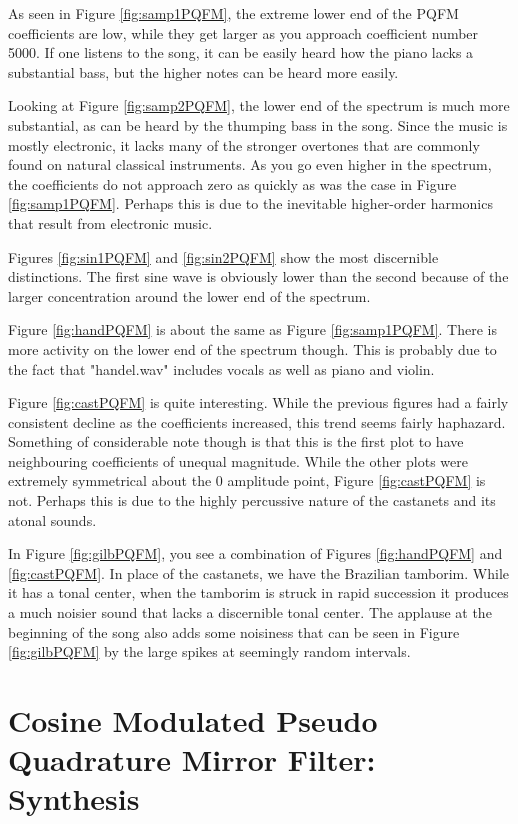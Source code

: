 \documentclass{article} %
\begin{document}
As seen in Figure \ref{fig:samp1PQFM}, the extreme lower end of the PQFM
coefficients are low, while they get larger as you approach coefficient
number 5000. If one listens to the song, it can be easily heard how the
piano lacks a substantial bass, but the higher notes can be heard more
easily. 

Looking at Figure \ref{fig:samp2PQFM}, the lower end of the spectrum is
much more substantial, as can be heard by the thumping bass in the song.
Since the music is mostly electronic, it lacks many of the stronger
overtones that are commonly found on natural classical instruments. As you
go even higher in the spectrum, the coefficients do not approach zero as
quickly as was the case in Figure \ref{fig:samp1PQFM}. Perhaps this is due
to the inevitable higher-order harmonics that result from electronic
music. 

Figures \ref{fig:sin1PQFM} and \ref{fig:sin2PQFM} show the most
discernible distinctions. The first sine wave is obviously lower than the
second because of the larger concentration around the lower end of the
spectrum. 

Figure \ref{fig:handPQFM} is about the same as Figure \ref{fig:samp1PQFM}.
There
is more activity on the lower end of the spectrum though. This is probably
due to the fact that "handel.wav" includes vocals as well as piano and
violin. 


Figure \ref{fig:castPQFM} is quite interesting. While the previous figures had
a fairly consistent decline as the coefficients increased, this trend
seems fairly haphazard. Something of considerable note though is that
this is the first plot to have neighbouring coefficients of unequal magnitude.
While the other plots were extremely symmetrical about the 0 amplitude point, 
Figure \ref{fig:castPQFM} is not. Perhaps this is due to the highly percussive
nature of the castanets and its atonal sounds. 

In Figure \ref{fig:gilbPQFM}, you see a combination of Figures \ref{fig:handPQFM}
and \ref{fig:castPQFM}. In place of the castanets, we have the Brazilian 
tamborim. While it has a tonal center, when the tamborim is struck in rapid
succession it produces a much noisier sound that lacks a discernible tonal
center. The applause at the beginning of the song also adds some noisiness
that can be seen in Figure \ref{fig:gilbPQFM} by the large spikes at seemingly
random intervals. 




\section{Cosine Modulated Pseudo Quadrature Mirror Filter: Synthesis}
\end{document}

